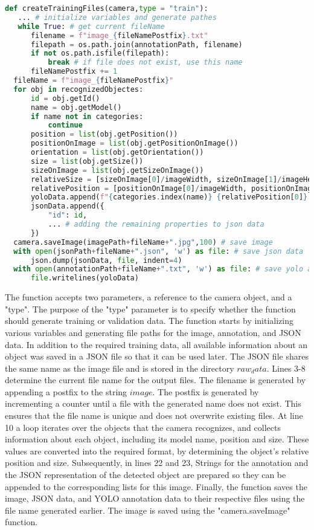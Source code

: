 \begin{lstlisting}[language=python]
def createTrainingFiles(camera,type = "train"):
   ... # initialize variables and generate pathes
   while True: # get current fileName
      filename = f"image_{fileNamePostfix}.txt"
      filepath = os.path.join(annotationPath, filename)
      if not os.path.isfile(filepath): 
          break # if file does not exist, use this name
      fileNamePostfix += 1
  fileName = f"image_{fileNamePostfix}"
  for obj in recognizedObjectes:
      id = obj.getId()
      name = obj.getModel()
      if name not in categories:
          continue
      position = list(obj.getPosition())
      positionOnImage = list(obj.getPositionOnImage())
      orientation = list(obj.getOrientation())
      size = list(obj.getSize())
      sizeOnImage = list(obj.getSizeOnImage())
      relativeSize = [sizeOnImage[0]/imageWidth, sizeOnImage[1]/imageHeight]
      relativePosition = [positionOnImage[0]/imageWidth, positionOnImage[1]/imageHeight]
      yoloData.append(f"{categories.index(name)} {relativePosition[0]} {relativePosition[1]} {relativeSize[0]} {relativeSize[1]}\n")
      jsonData.append({
          "id": id,
          ... # adding the remaining properties to json data
      })
  camera.saveImage(imagePath+fileName+".jpg",100) # save image
  with open(jsonPath+fileName+".json", 'w') as file: # save json data
      json.dump(jsonData, file, indent=4)   
  with open(annotationPath+fileName+".txt", 'w') as file: # save yolo annotation
      file.writelines(yoloData)
\end{lstlisting}
The function accepts two parameters, a reference to the camera object, and a "type". The purpose of the "type" parameter is to specify whether the function should generate training or validation data. The function starts by initializing various variables and generating file paths for the image, annotation, and JSON data. In addition to the required training data, all available information about an object was saved in a JSON file so that it can be used later. The JSON file shares the same name as the image file and is stored in the directory \(raw_data\). Lines 3-8 determine the current file name for the output files. The filename is generated by appending a postfix to the string \(image\). The postfix is generated by incrementing a counter until a file with the generated name does not exist. This ensures that the file name is unique and does not overwrite existing files.
At line 10 a loop iterates over the objects that the camera recognizes, and collects information about each object, including its model name, position and size. These values are converted into the required format, by determining the object's relative position and size. Subsequently, in lines 22 and 23, Strings for the annotation and the JSON representation of the detected object are prepared so they can be appended to the corresponding lists for this image. Finally, the function saves the image, JSON data, and YOLO annotation data to their respective files using the file name generated earlier. The image is saved using the "camera.saveImage" function.


